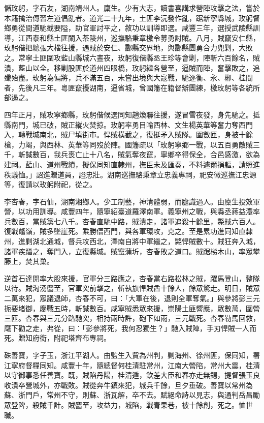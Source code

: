 \begin{pinyinscope}
儲玫躬，字石友，湖南靖州人。廩生。少有大志，讀書喜講求營陣攻擊之法，嘗於本籍擒治傳習左道倡亂者。道光二十九年，土匪李沅發作亂，踞新寧縣城，玫躬督鄉勇從間道馳截要隘，助官軍討平之，敘功以訓導即選。咸豐三年，選授武陵縣訓導，江西泰和縣土匪闌入茶陵州，巡撫駱秉章檄令募勇討賊。八月，賊竄安仁縣，玫躬偕把總張大楷往援，遇賊於安仁、酃縣交界地，與酃縣團勇合力兜剿，大敗之。常寧土匪圍攻藍山縣城六晝夜，玫躬復偕縣丞王珍等會剿，陣斬六百餘名，賊潰，藍山以全。移剿股匪於道州四眼橋，玫躬繼各營至，逼賊而陣，奮擊敗之，追殲殆盡。玫躬為偏將，兵不滿五百，未嘗出境與大寇戰，馳逐衡、永、郴、桂間者，先後凡三年。粵匪竄擾湖南，逼省城，曾國籓在籍督辦團練，檄玫躬等各統所部遏之。

四年正月，賊攻寧鄉縣，玫躬偕候選同知趙煥聯往援，遂冒雪夜發，身先馳之。抵縣南門，城已破，賊正縱火焚掠。玫躬率勇目喻西林、文生楊英華等奮力奪西門入，轉戰城南北，賊尸填街市。悍賊橫截之，復挺矛入賊隊。圍數匝，身被十餘槍，力竭，與西林、英華等同歿於陣。國籓疏以「玫躬寧鄉一戰，以五百勇敵賊三千，斬馘數百，我兵喪亡止十八名，賊氣奪夜竄，寧鄉卒得保全，合邑感激，欲為建祠。藍山、道州戰績，擬保同知直隸州，撫臣未及匯奏，不料遽爾捐軀，請照進秩議恤。」詔進贈道員，謚忠壯。湖南巡撫駱秉章立忠義專祠，祀安徽巡撫江忠源等，復請以玫躬附祀，從之。

李杏春，字石仙，湖南湘鄉人。少工制藝，神清體弱，而膽識過人。由廩生投效軍營，以功用訓導。咸豐四年，隨寧紹臺道羅澤南軍。義寧州之戰，與縣丞蔣益澧率兵數百，當賊黨七八千。杏春直馳中路，賊潰走，諸軍追殺十餘里，斃賊六百人。復戰鼇嶺，賊多墜崖死。乘勝偪西門，與各軍環攻，克之。至是累功進同知直隸州，進剿湖北通城，督兵攻西北，澤南自將中軍繼之，斃悍賊數十。賊狂奔入城，諸軍疾躡之，奪門入，立復縣城。賊竄蒲圻，杏春敗之道口。賊踞梯木山，率眾攀藤上，焚其巢。

逆首石達開率大股來援，官軍分三路應之，杏春當右路松林之賊，躍馬登山，整隊以待。賊洶湧麕至，官軍突前擊之，斬執旗悍賊酋十餘人，餘眾驚走。明日，賊眾二萬來犯，眾議退師，杏春不可，曰：「大軍在後，退則全軍奪氣。」與參將彭三元扼要堵御，鏖戰五時，斬馘數百。咸寧賊悉眾來援，崇陽土匪響應，眾數萬，圍營三匝。杏春與三元分路馳突，相持兩時許，砲下如雨，三元戰死。杏春勒馬回救，麾下勸之走，弗從，曰：「彭參將死，我何忍獨生？」馳入賊陣，手刃悍賊一人而死。贈知府銜，附祀塔齊布專祠。

硃善寶，字子玉，浙江平湖人。由監生入貲為州判，剿海州、徐州匪，保同知，署江寧府督糧同知。咸豐十年，隨總督何桂清駐常州，江南大營陷，常州大震，桂清以守御事悉任善寶。既，賊陷丹陽，桂清遁，欽差大臣和春亦走無錫，提督張玉良收潰卒營城外，亦戰敗。賊從奔牛鎮來犯，城兵千餘，旦夕垂破。善寶以常州為蘇、浙門戶，常州不守，則蘇、浙瓦解，卒不去。賦絕命詩以見志，與通判岳昌勵眾登陴，殺賊千計。賊麕至，攻益力，城陷，戰青果巷，被十餘創，死之。恤世職。


\end{pinyinscope}
